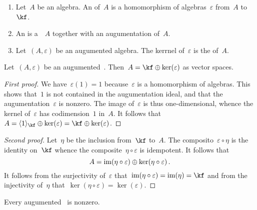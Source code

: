 \begin{definition}
	\leavevmode
	\begin{enumerate}
		\item
			Let~$A$ be an algebra.
			An  of~$A$ is a homomorphism of algebras~$\varepsilon$ from~$A$ to~$\kf$.
		\item
			An  is a~\algebra{$\kf$}~$A$ together with an augumentation of~$A$.
		\item
			Let~$(A, \varepsilon)$ be an augumented algebra.
			The kerrnel of~$\varepsilon$ is the  of~$A$.
	\end{enumerate}
\end{definition}


\begin{proposition}
	\label{decomposition for augumented algebra}
	Let~$(A, \varepsilon) $ be an augumented~\algebra{$\kf$}.
	Then~$A = \kf \oplus \ker(\varepsilon)$ as vector spaces.
\end{proposition}


\begin{proof}[First proof]
	We have~$\varepsilon(1) = 1$ because~$\varepsilon$ is a homomorphism of algebras.
	This shows that~$1$ is not contained in the augumentation ideal, and that the augumentation~$\varepsilon$ is nonzero.
	The image of~$\varepsilon$ is thus one-dimensional, whence the kernel of~$\varepsilon$ has codimension~$1$ in~$A$.
	It follows that~$A = \gen{1}_{\kf} \oplus \ker(\varepsilon) = \kf \oplus \ker(\varepsilon)$.
\end{proof}


\begin{proof}[Second proof]
	Let~$\eta$ be the inclusion from~$\kf$ to~$A$.
	The composito~$\varepsilon \circ \eta$ is the identity on~$\kf$ whence the composite~$\eta \circ \varepsilon$ is idempotent.
	It follows that
	\[
		A
		=
		\operatorname{im}(\eta \circ \varepsilon)
		\oplus \ker(\eta \circ \varepsilon) \,.
	\]
	It follows from the surjectivity of~$\varepsilon$ that~$\im(\eta \circ \varepsilon) = \im(\eta) = \kf$ and from the injectivity of~$\eta$ that~$\ker(\eta \circ \varepsilon) = \ker(\varepsilon)$.
\end{proof}


\begin{corollary}
	Every augumented~\algebra{$\kf$} is nonzero.
	\qedhere
\end{corollary}


